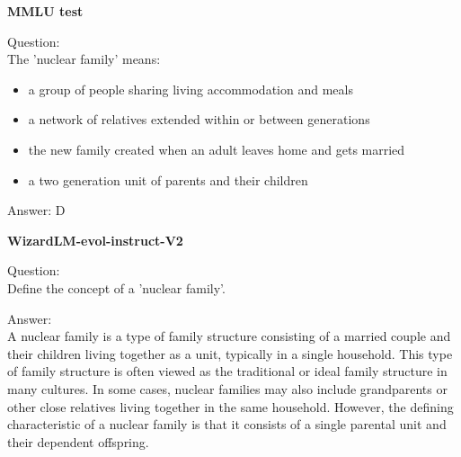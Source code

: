 \begin{tcolorbox}[title={WizardLM-evol-instruct-V2 Rephrased Sample}]

\textbf{MMLU test}



Question: \\
The 'nuclear family' means:
    \begin{itemize}
        \item[A.] a group of people sharing living accommodation and meals
        \item[B.] a network of relatives extended within or between generations
        \item[C.] the new family created when an adult leaves home and gets married
        \item[D.] a two generation unit of parents and their children
    \end{itemize}

Answer: D

\vspace{0.5cm}

\textbf{WizardLM-evol-instruct-V2}

Question: \\
Define the concept of a 'nuclear family'.

Answer: \\
A nuclear family is a type of family structure consisting of a married couple and their children living together as a unit, typically in a single household. This type of family structure is often viewed as the traditional or ideal family structure in many cultures. In some cases, nuclear families may also include grandparents or other close relatives living together in the same household. However, the defining characteristic of a nuclear family is that it consists of a single parental unit and their dependent offspring.
\end{tcolorbox}



